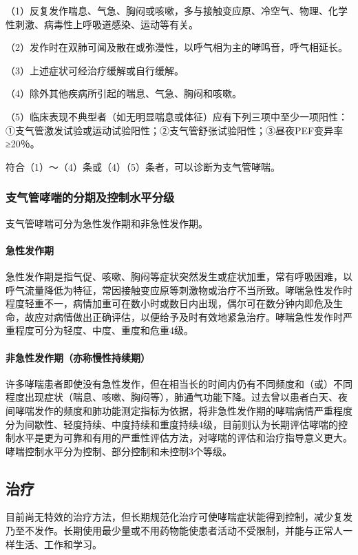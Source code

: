 （1）反复发作喘息、气急、胸闷或咳嗽，多与接触变应原、冷空气、物理、化学性刺激、病毒性上呼吸道感染、运动等有关。

（2）发作时在双肺可闻及散在或弥漫性，以呼气相为主的哮鸣音，呼气相延长。

（3）上述症状可经治疗缓解或自行缓解。

（4）除外其他疾病所引起的喘息、气急、胸闷和咳嗽。

（5）临床表现不典型者（如无明显喘息或体征）应有下列三项中至少一项阳性：①支气管激发试验或运动试验阳性；②支气管舒张试验阳性；③昼夜PEF变异率≥20％。

符合（1）～（4）条或（4）（5）条者，可以诊断为支气管哮喘。

\subsubsection{支气管哮喘的分期及控制水平分级}

支气管哮喘可分为急性发作期和非急性发作期。
\paragraph{急性发作期}

急性发作期是指气促、咳嗽、胸闷等症状突然发生或症状加重，常有呼吸困难，以呼气流量降低为特征，常因接触变应原等刺激物或治疗不当所致。哮喘急性发作时程度轻重不一，病情加重可在数小时或数日内出现，偶尔可在数分钟内即危及生命，故应对病情做出正确评估，以便给予及时有效地紧急治疗。哮喘急性发作时严重程度可分为轻度、中度、重度和危重4级。
\paragraph{非急性发作期（亦称慢性持续期）}

许多哮喘患者即使没有急性发作，但在相当长的时间内仍有不同频度和（或）不同程度出现症状（喘息、咳嗽、胸闷等），肺通气功能下降。过去曾以患者白天、夜间哮喘发作的频度和肺功能测定指标为依据，将非急性发作期的哮喘病情严重程度分为间歇性、轻度持续、中度持续和重度持续4级，目前则认为长期评估哮喘的控制水平是更为可靠和有用的严重性评估方法，对哮喘的评估和治疗指导意义更大。哮喘控制水平分为控制、部分控制和未控制3个等级。

\subsection{治疗}

目前尚无特效的治疗方法，但长期规范化治疗可使哮喘症状能得到控制，减少复发乃至不发作。长期使用最少量或不用药物能使患者活动不受限制，并能与正常人一样生活、工作和学习。

